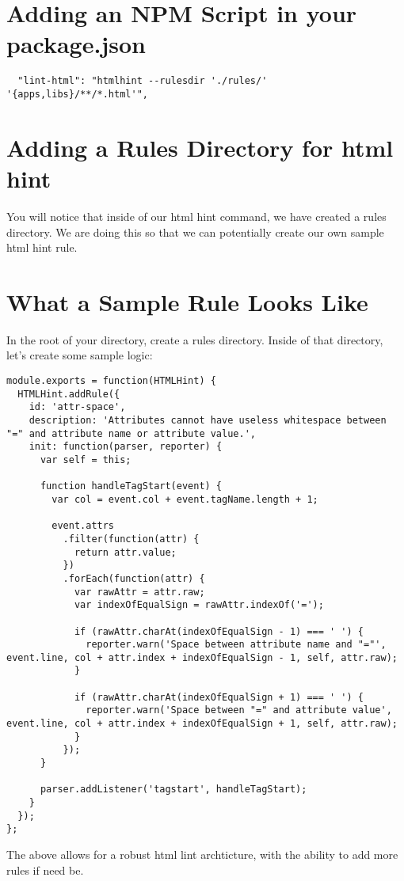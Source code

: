 \section{Adding an NPM Script in your package.json}
\begin{lstlisting}
  "lint-html": "htmlhint --rulesdir './rules/' '{apps,libs}/**/*.html'",
\end{lstlisting}

\section{Adding a Rules Directory for html hint}
You will notice that inside of our html hint command, we have created a rules
directory. We are doing this so that we can potentially create our own sample
html hint rule.

\section{What a Sample Rule Looks Like}
In the root of your directory, create a rules directory. Inside of that
directory, let's create some sample logic:
\begin{lstlisting}
module.exports = function(HTMLHint) {
  HTMLHint.addRule({
    id: 'attr-space',
    description: 'Attributes cannot have useless whitespace between "=" and attribute name or attribute value.',
    init: function(parser, reporter) {
      var self = this;

      function handleTagStart(event) {
        var col = event.col + event.tagName.length + 1;

        event.attrs
          .filter(function(attr) {
            return attr.value;
          })
          .forEach(function(attr) {
            var rawAttr = attr.raw;
            var indexOfEqualSign = rawAttr.indexOf('=');

            if (rawAttr.charAt(indexOfEqualSign - 1) === ' ') {
              reporter.warn('Space between attribute name and "="', event.line, col + attr.index + indexOfEqualSign - 1, self, attr.raw);
            }

            if (rawAttr.charAt(indexOfEqualSign + 1) === ' ') {
              reporter.warn('Space between "=" and attribute value', event.line, col + attr.index + indexOfEqualSign + 1, self, attr.raw);
            }
          });
      }

      parser.addListener('tagstart', handleTagStart);
    }
  });
};
\end{lstlisting}

The above allows for a robust html lint archticture, with the ability to add
more rules if need be.
